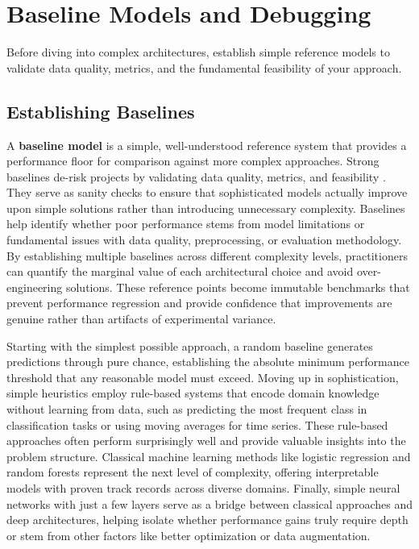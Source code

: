 
\section{Baseline Models and Debugging }
\label{sec:baselines-debugging}

Before diving into complex architectures, establish simple reference models to validate data quality, metrics, and the fundamental feasibility of your approach.

\subsection{Establishing Baselines}

A \textbf{baseline model} is a simple, well-understood reference system that provides a performance floor for comparison against more complex approaches. Strong baselines de-risk projects by validating data quality, metrics, and feasibility \textcite{GoodfellowEtAl2016,Prince2023}. They serve as sanity checks to ensure that sophisticated models actually improve upon simple solutions rather than introducing unnecessary complexity. Baselines help identify whether poor performance stems from model limitations or fundamental issues with data quality, preprocessing, or evaluation methodology. By establishing multiple baselines across different complexity levels, practitioners can quantify the marginal value of each architectural choice and avoid over-engineering solutions. These reference points become immutable benchmarks that prevent performance regression and provide confidence that improvements are genuine rather than artifacts of experimental variance. 

Starting with the simplest possible approach, a random baseline generates predictions through pure chance, establishing the absolute minimum performance threshold that any reasonable model must exceed. Moving up in sophistication, simple heuristics employ rule-based systems that encode domain knowledge without learning from data, such as predicting the most frequent class in classification tasks or using moving averages for time series. These rule-based approaches often perform surprisingly well and provide valuable insights into the problem structure. Classical machine learning methods like logistic regression and random forests represent the next level of complexity, offering interpretable models with proven track records across diverse domains. Finally, simple neural networks with just a few layers serve as a bridge between classical approaches and deep architectures, helping isolate whether performance gains truly require depth or stem from other factors like better optimization or data augmentation.


